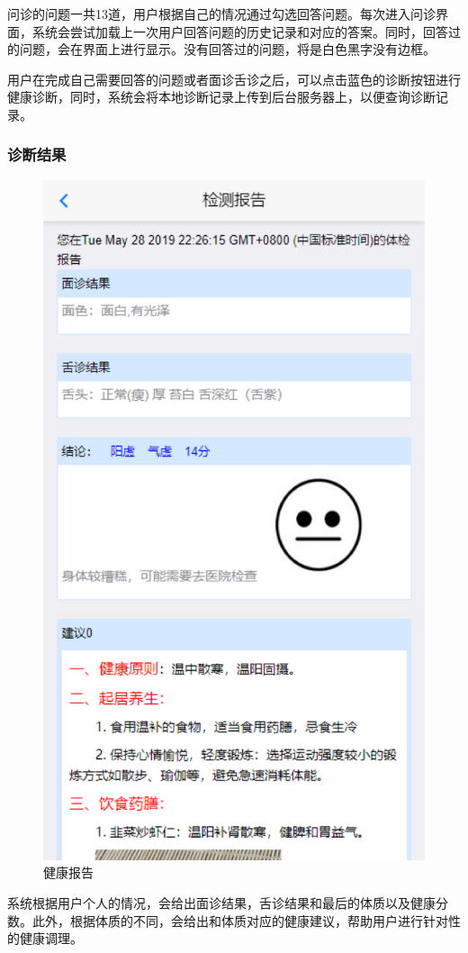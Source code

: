 问诊的问题一共13道，用户根据自己的情况通过勾选回答问题。每次进入问诊界面，系统会尝试加载上一次用户回答问题的历史记录和对应的答案。同时，回答过的问题，会在界面上进行显示。没有回答过的问题，将是白色黑字没有边框。


用户在完成自己需要回答的问题或者面诊舌诊之后，可以点击蓝色的诊断按钮进行健康诊断，同时，系统会将本地诊断记录上传到后台服务器上，以便查询诊断记录。

\subsubsection{诊断结果}
\begin{figure}
    \centering
    \includegraphics{images/report.png}
    \caption{健康报告}
    \label{fig:report}
\end{figure}
系统根据用户个人的情况，会给出面诊结果，舌诊结果和最后的体质以及健康分数。此外，根据体质的不同，会给出和体质对应的健康建议，帮助用户进行针对性的健康调理。

